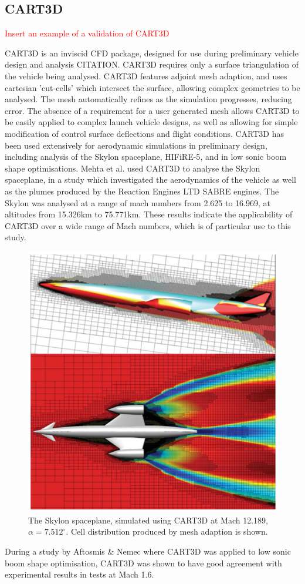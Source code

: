 \subsection{CART3D}
\textcolor{red}{Insert an example of a validation of CART3D}


CART3D is an inviscid CFD package, designed for use during preliminary vehicle design and analysis CITATION. CART3D requires only a surface triangulation of the vehicle being analysed. CART3D features adjoint mesh adaption, and uses cartesian 'cut-cells' which intersect the surface, allowing complex geometries to be analysed. The mesh automatically refines as the simulation progresses, reducing error. The absence of a requirement for a user generated mesh allows CART3D to be easily applied to complex launch vehicle designs, as well as allowing for simple modification of control surface deflections and flight conditions. 
CART3D has been used extensively for aerodynamic simulations in preliminary design, including analysis of the Skylon spaceplane\cite{Mehta2016}, HIFiRE-5\cite{Kimmel2010}, and in low sonic boom shape optimisations\cite{Aftosmis2011}. 
Mehta et al. used CART3D to analyse the Skylon spaceplane, in a study which investigated the aerodynamics of the vehicle as well as the plumes produced by the Reaction Engines LTD SABRE engines\cite{Mehta2016}. The Skylon was analysed at a range of mach numbers from 2.625 to 16.969, at altitudes from 15.326km to 75.771km. These results indicate the applicability of CART3D over a wide range of Mach numbers, which is of particular use to this study.
\begin{figure}
\centering
\includegraphics[width=0.6\linewidth]{figures/2_literature-review/Skylon-CART3D}
\caption{The Skylon spaceplane, simulated using CART3D at Mach 12.189, $\alpha=7.512^\circ$\cite{Mehta2016}. Cell distribution produced by mesh adaption is shown.}
\label{fig:Skylon-CART3D}
\end{figure}
During a study by Aftosmis \& Nemec where CART3D was applied to low sonic boom shape optimisation, CART3D was shown to have good agreement with experimental results in tests at Mach 1.6. 


